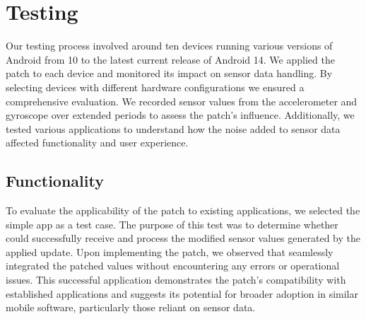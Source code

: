 \documentclass[11pt,
  oneside,openany,    %
]{scrreprt}
\begin{document}
\section{Testing}
\label{sec:testing}
Our testing process involved around ten devices running various versions of Android from 10 to the latest current release of Android 14.
We applied the patch to each device and monitored its impact on sensor data handling.
By selecting devices with different hardware configurations we ensured a comprehensive evaluation.
We recorded sensor values from the accelerometer and gyroscope over extended periods to assess the patch's influence.
Additionally, we tested various applications to understand how the noise added to sensor data affected functionality and user experience.

\subsection{Functionality}
\label{subsec:functionality}
To evaluate the applicability of the patch to existing applications, we selected the simple app  as a test case.
The purpose of this test was to determine whether  could successfully receive and process the modified sensor values generated by the applied update.
Upon implementing the patch, we observed that  seamlessly integrated the patched values without encountering any errors or operational issues.
This successful application demonstrates the patch's compatibility with established applications and suggests its potential for broader adoption in similar mobile software, particularly those reliant on sensor data.
\end{document}
